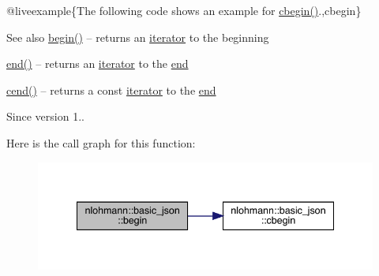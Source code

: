 @liveexample\{The following code shows an example for {\ttfamily \mbox{\hyperlink{classnlohmann_1_1basic__json_ad865d6c291b237ae508d5cb2146b5877}{cbegin()}}}.,cbegin\}

\begin{DoxySeeAlso}{See also}
\mbox{\hyperlink{classnlohmann_1_1basic__json_a0ff28dac23f2bdecee9564d07f51dcdc}{begin()}} -- returns an \mbox{\hyperlink{classnlohmann_1_1basic__json_a099316232c76c034030a38faa6e34dca}{iterator}} to the beginning 

\mbox{\hyperlink{classnlohmann_1_1basic__json_a13e032a02a7fd8a93fdddc2fcbc4763c}{end()}} -- returns an \mbox{\hyperlink{classnlohmann_1_1basic__json_a099316232c76c034030a38faa6e34dca}{iterator}} to the \mbox{\hyperlink{classnlohmann_1_1basic__json_a13e032a02a7fd8a93fdddc2fcbc4763c}{end}} 

\mbox{\hyperlink{classnlohmann_1_1basic__json_a8dba7b7d2f38e6b0c614030aa43983f6}{cend()}} -- returns a const \mbox{\hyperlink{classnlohmann_1_1basic__json_a099316232c76c034030a38faa6e34dca}{iterator}} to the \mbox{\hyperlink{classnlohmann_1_1basic__json_a13e032a02a7fd8a93fdddc2fcbc4763c}{end}}
\end{DoxySeeAlso}
\begin{DoxySince}{Since}
version 1.. 
\end{DoxySince}
Here is the call graph for this function\+:\nopagebreak
\begin{figure}[H]
\begin{center}
\leavevmode
\includegraphics[width=341pt]{classnlohmann_1_1basic__json_a4f0f5dd42b2987ff20306ed78bd31d1d_cgraph}
\end{center}
\end{figure}
\mbox{\label{classnlohmann_1_1basic__json_ad865d6c291b237ae508d5cb2146b5877}} 
